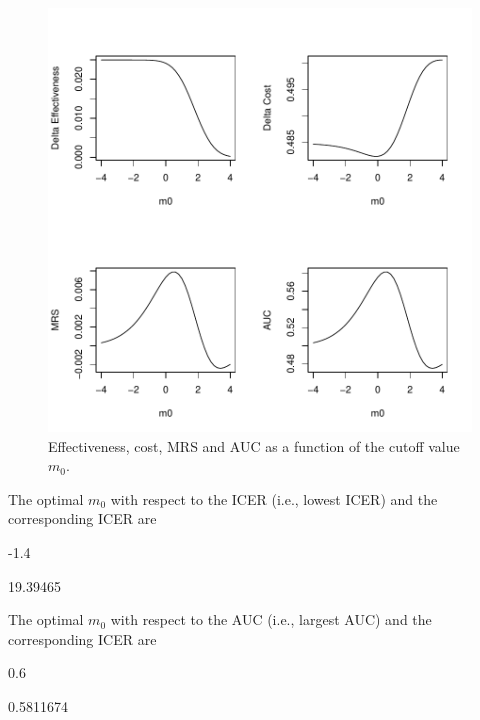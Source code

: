 \documentclass[11pt]{article}
\begin{document}
\begin{figure}
\begin{center}
\includegraphics{Screening_biomarker_07142018-fig1}
\end{center}
\label{fig:one}
\caption{Effectiveness, cost, MRS and AUC as a function of the cutoff value $m_0$.}
\end{figure}

The optimal $m_0$ with respect to the ICER (i.e., lowest ICER) and the corresponding ICER are
\begin{Schunk}
\begin{Soutput}
[1] -1.4
\end{Soutput}
\begin{Soutput}
[1] 19.39465
\end{Soutput}
\end{Schunk}

The optimal $m_0$ with respect to the AUC (i.e., largest AUC) and the corresponding ICER are
\begin{Schunk}
\begin{Soutput}
[1] 0.6
\end{Soutput}
\begin{Soutput}
[1] 0.5811674
\end{Soutput}
\end{Schunk}
\end{document}
